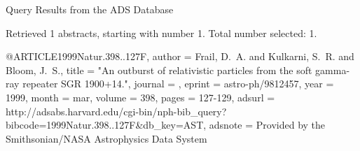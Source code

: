 Query Results from the ADS Database


Retrieved 1 abstracts, starting with number 1.  Total number selected: 1.

@ARTICLE{1999Natur.398..127F,
   author = {{Frail}, D.~A. and {Kulkarni}, S.~R. and {Bloom}, J.~S.},
    title = "{An outburst of relativistic particles from the soft gamma-ray repeater SGR 1900+14.}",
  journal = {\nat},
   eprint = {astro-ph/9812457},
     year = 1999,
    month = mar,
   volume = 398,
    pages = {127-129},
   adsurl = {http://adsabs.harvard.edu/cgi-bin/nph-bib_query?bibcode=1999Natur.398..127F&db_key=AST},
  adsnote = {Provided by the Smithsonian/NASA Astrophysics Data System}
}


